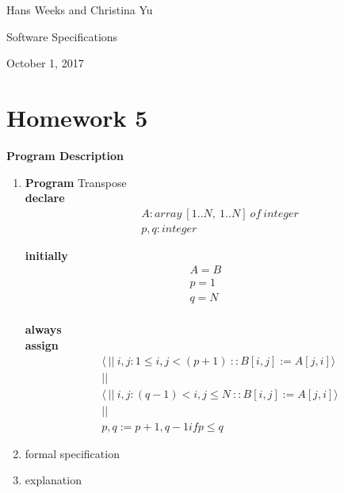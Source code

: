 \documentclass{article}
\begin{document}
\hfill Hans Weeks and Christina Yu

\hfill Software Specifications

\hfill October 1, 2017
\section*{Homework 5}
\textbf{Program Description}\\

\begin{enumerate}
\item
\textbf{Program} Transpose\\
\textbf{declare}\\

\begin{align*}
&A: array \ [1..N,\ 1..N]\ of \ integer\\
&p, q: integer
\end{align*}

\textbf{initially}\\

\begin{align*}
A=B\quad&\\
p=1\quad&\\
q=N\quad&\\
\end{align*}


\textbf{always}\\
\textbf{assign}\\

\begin{align*}
&\langle \ || \ i,j : 1\leq i,j< (p+1) \ :: B[i,j]:=A[j,i] \rangle \\
&||\\
&\langle \ || \ i,j : (q-1) < i,j \leq N \ :: B[i,j]:=A[j,i] \rangle \\
&||\\
&p,q := p+1, q-1 if p \leq q
\end{align*}

\item formal specification
\item explanation
\end{enumerate}
\end{document}
